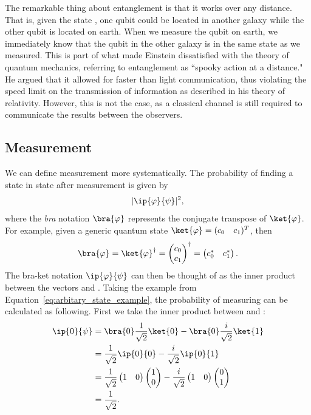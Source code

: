 \documentclass[a4paper,10pt]{article}
\newcommand{\qstatezero}{
	\begin{pmatrix}1 \\ 0\end{pmatrix}
}
\newcommand{\qstateone}{
	\begin{pmatrix}0 \\ 1\end{pmatrix}
}
\begin{document}
The remarkable thing about entanglement is that it works over any distance.
That is, given the state \ket{\Phi^+}, one qubit could be located in another galaxy while the other qubit is located on earth.
When we measure the qubit on earth, we immediately know that the qubit in the other galaxy is in the same state as we measured.
This is part of what made Einstein dissatisfied with the theory of quantum mechanics, referring to entanglement as ``spooky action at a distance."
He argued that it allowed for faster than light communication, thus violating the speed limit on the transmission of information as described in his theory of relativity.
However, this is not the  case, as a classical channel is still required to communicate the results between the observers.

\subsection{Measurement}
We can define measurement more systematically.
The probability of finding a state \ket{\psi} in state \ket{\varphi} after measurement is given by
\begin{equation}
\lvert\ip{\varphi}{\psi}\rvert^2,
\end{equation}
where the \emph{bra} notation $\bra{\varphi}$ represents the conjugate transpose of $\ket{\varphi}$.
For example, given a generic quantum state $\ket{\varphi} = (\begin{matrix}c_0 & c_1\end{matrix})^T$, then 
\begin{equation}
\bra{\varphi} = \ket{\varphi}^\dagger = \begin{pmatrix}c_0 \\ c_1\end{pmatrix}^\dagger =  \begin{pmatrix}c_0^* & c_1^*\end{pmatrix}.
\end{equation}
The bra-ket notation $\ip{\varphi}{\psi}$ can then be thought of as the inner product between the vectors \ket{\varphi} and \ket{\psi}.
Taking the example from Equation~\ref{eq:arbitary_state_example}, the probability of measuring  can be calculated as following.
First we take the inner product between  and \ket{\psi}:
\begin{equation}
\begin{aligned}
\ip{0}{\psi} &= \bra{0}\dfrac{1}{\sqrt2}\ket{0} - \bra{0}\dfrac{i}{\sqrt2}\ket{1} \\
&= \dfrac{1}{\sqrt2}\ip{0}{0} - \dfrac{i}{\sqrt2}\ip{0}{1} \\
&= \dfrac{1}{\sqrt2}\begin{pmatrix}1 & 0\end{pmatrix} \qstatezero - \dfrac{i}{\sqrt2}\begin{pmatrix}1 & 0\end{pmatrix} \qstateone \\
&= \dfrac{1}{\sqrt2}. \\
\end{aligned}
\end{equation}
\end{document}
